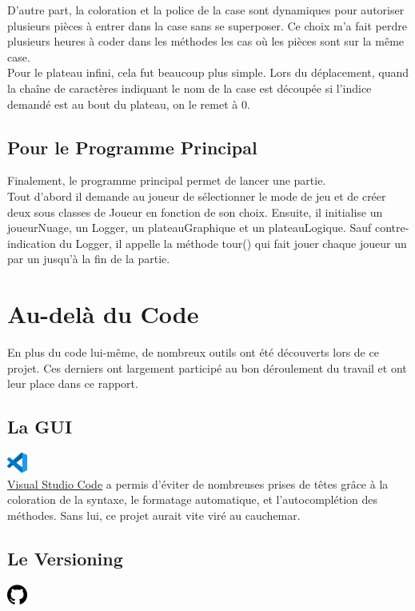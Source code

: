 \documentclass[titlepage]{report}
\begin{document}
D’autre part, la coloration et la police de la case sont dynamiques pour autoriser plusieurs pièces à entrer dans la case sans se superposer. Ce choix m’a fait perdre plusieurs heures à coder dans les méthodes les cas où les pièces sont sur la même case. \\

Pour le plateau infini, cela fut beaucoup plus simple. Lors du déplacement, quand la chaîne de caractères indiquant le nom de la case est découpée si l’indice demandé est au bout du plateau, on le remet à 0.

\section{Pour le Programme Principal}
\noindent Finalement, le programme principal permet de lancer une partie. \\

Tout d’abord il demande au joueur de sélectionner le mode de jeu et de créer deux sous classes de Joueur en fonction de son choix. Ensuite, il initialise un joueurNuage, un Logger, un plateauGraphique et un plateauLogique. Sauf contre-indication du Logger, il appelle la méthode tour() qui fait jouer chaque joueur un par un jusqu’à la fin de la partie.  

\chapter{Au-delà du Code}
En plus du code lui-même, de nombreux outils ont été découverts lors de ce projet. Ces derniers ont largement participé au bon déroulement du travail et ont leur place dans ce rapport. 
\section{La GUI}
\includegraphics[width=0.05\textwidth]{img/vscode_logo.png}\\

\href{https://code.visualstudio.com/}{Visual Studio Code} a permis d’éviter de nombreuses prises de têtes grâce à la coloration de la syntaxe, le formatage automatique, et l’autocomplétion des méthodes. Sans lui, ce projet aurait vite viré au cauchemar. 
\section{Le Versioning}
\includegraphics[width=0.05\textwidth]{img/github_logo.png}\\
\end{document}
